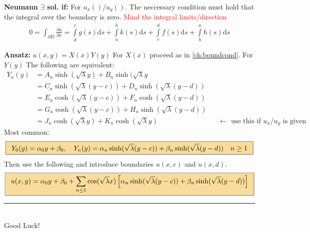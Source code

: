 \documentclass[10pt,landscape]{article}
\newcommand{\eqbox}[1]{\fcolorbox{black}{formula}{\hspace{0.5em}$\displaystyle#1$\hspace{0.5em}}}
\newcommand{\Int}{\int\limits}
\newcommand\warning{%
 \makebox[1.4em][c]{%
 \makebox[0pt][c]{\raisebox{.1em}{\small!}}%
 \makebox[0pt][c]{\color{red}\Large$\bigtriangleup$}}}%
\begin{document}
\begin{multicols*}{2}
\textbf{Neumann $\exists$ sol. if:} For $u_x()/u_y()$. The neccessary condition must hold that the integral over the boundary is zero. \warning\textcolor{red}{Mind the integral limits/direction}
  \begin{align*}
      0 = \int_{\partial D} \frac{\partial u}{\partial v} = 
      \Int^c_dg(s)\mathrm{d}s+ \Int^b_ak(s)\mathrm{d}s+\Int^d_cf(s)\mathrm{d}s+ \Int^a_bh(s)\mathrm{d}s
  \end{align*}

\textbf{Ansatz:} $u(x,y)=X(x)Y(y)$ For $X(x)$ proceed as in \ref{ch:boundcond}. For $Y(y)$ The following are equivalent:
  \begin{align*}
    Y_n(y) &= A_n \sinh(\sqrt{\lambda}y) + B_n \sinh(\sqrt{\lambda}y & &\\
           &= C_n \sinh(\sqrt{\lambda}(y-c)) + D_n \sinh(\sqrt{\lambda}(y-d)) & &\\
           &= E_n \cosh(\sqrt{\lambda}(y-c)) + F_n \cosh(\sqrt{\lambda}(y-d)) & &\\
           &= G_n \cosh(\sqrt{\lambda}(y-c)) + H_n \sinh(\sqrt{\lambda}(y-d)) & &\\
           &= J_n \cosh(\sqrt{\lambda}y) + K_n \cosh(\sqrt{\lambda}y) & &\leftarrow\text{ use this if $u_x/u_y$ is given}
  \end{align*}
Most common:
\begin{align*}
  \eqbox{Y_0(y) = \alpha_0y+\beta_0, \quad Y_n(y) = \alpha_n \sinh(\sqrt{\lambda}(y-c)) + \beta_n \sinh(\sqrt{\lambda}(y-d)) \quad n \geq 1}
\end{align*}
Then use the following and introduce boundaries $u(x,c)$ and $u(x,d)$.
\begin{align*}
  \eqbox{u(x,y) = \alpha_0y+\beta_0+\sum_{n\leq1}\cos(\sqrt{\lambda}x)\left[\alpha_n\sinh(\sqrt{\lambda}(y-c))+\beta_n\sinh(\sqrt{\lambda}(y-d))\right]}
\end{align*}




\vspace*{\fill}
\rule{0.3\linewidth}{0.25pt}\\
Good Luck!
%
%
\end{multicols*}
\end{document}
